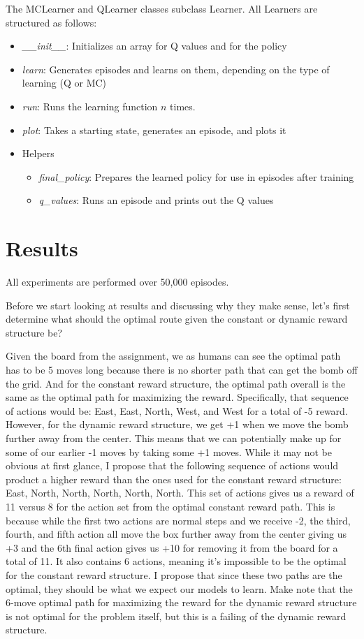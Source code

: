 \documentclass[12pt]{article}
\begin{document}
The MCLearner and QLearner classes subclass Learner. All Learners are structured as follows:
\begin{itemize}
  \item \textit{\_\_init\_\_}: Initializes an array for Q values and for the policy
  \item \textit{learn}: Generates episodes and learns on them, depending on the type of learning (Q or MC)
  \item \textit{run}: Runs the learning function $n$ times.
  \item \textit{plot}: Takes a starting state, generates an episode, and plots it
  \item Helpers
        \begin{itemize}
          \item \textit{final\_policy}: Prepares the learned policy for use in episodes after training
          \item \textit{q\_values}: Runs an episode and prints out the Q values
        \end{itemize}
\end{itemize}

\section{Results}

All experiments are performed over 50,000 episodes.

Before we start looking at results and discussing why they make sense, let's first determine what should the optimal route given the constant or dynamic reward structure be?

Given the board from the assignment, we as humans can see the optimal path has to be 5 moves long because there is no shorter path that can get the bomb off the grid. And for the constant reward structure, the optimal path overall is the same as the optimal path for maximizing the reward. Specifically, that sequence of actions would be: East, East, North, West, and West for a total of -5 reward. However, for the dynamic reward structure, we get +1 when we move the bomb further away from the center. This means that we can potentially make up for some of our earlier -1 moves by taking some +1 moves. While it may not be obvious at first glance, I propose that the following sequence of actions would product a higher reward than the ones used for the constant reward structure: East, North, North, North, North, North. This set of actions gives us a reward of 11 versus 8 for the action set from the optimal constant reward path. This is because while the first two actions are normal steps and we receive -2, the third, fourth, and fifth action all move the box further away from the center giving us +3 and the 6th final action gives us +10 for removing it from the board for a total of 11. It also contains 6 actions, meaning it's impossible to be the optimal for the constant reward structure. I propose that since these two paths are the optimal, they should be what we expect our models to learn. Make note that the 6-move optimal path for maximizing the reward for the dynamic reward structure is not optimal for the problem itself, but this is a failing of the dynamic reward structure.
\end{document}
